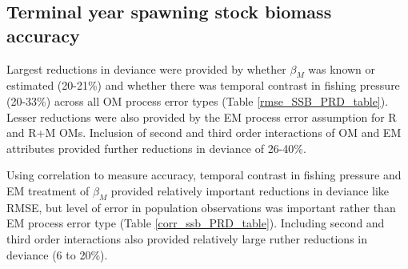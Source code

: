 \documentclass[
  12pt,
]{article}
\begin{document}
\subsection*{Terminal year spawning stock biomass
accuracy}\label{terminal-year-spawning-stock-biomass-accuracy}

Largest reductions in deviance were provided by whether \(\beta_M\) was
known or estimated (20-21\%) and whether there was temporal contrast in
fishing pressure (20-33\%) across all OM process error types (Table
\ref{rmse_SSB_PRD_table}). Lesser reductions were also provided by the
EM process error assumption for R and R+M OMs. Inclusion of second and
third order interactions of OM and EM attributes provided further
reductions in deviance of 26-40\%.

Using correlation to measure accuracy, temporal contrast in fishing
pressure and EM treatment of \(\beta_M\) provided relatively important
reductions in deviance like RMSE, but level of error in population
observations was important rather than EM process error type (Table
\ref{corr_ssb_PRD_table}). Including second and third order interactions
also provided relatively large ruther reductions in deviance (6 to
20\%).

\begin{table}
\caption{Percent reduction in deviance for logistic regression models fit to indicators of convergence (providing Hessian-based standard errors). Table rows give each operating model (OM) and estimating model (EM) factor included individually, combined, and with second and third order interactions. Table columns categorize operating models (OMs) with process error on recruitment only (R), recruitment and apparent survival (R+S), or recruitment and natural mortality (R+M). See Table \ref{factor_table} for further details.}\label{convergence_PRD_table}
{}
\end{table}
\pagebreak

\begin{table}
\caption{Percent reduction in deviance for multinomial logistic regression models fit to indicators of process error assumption in the estimating models with lowest AIC. See Tables \ref{convergence_PRD_table} and \ref{factor_table} for further details.}\label{AIC_PE_PRD_table}
{}
\end{table}
\pagebreak

\begin{table}
\caption{Percent reduction in deviance for logistic regression models fit to indicators of correct estimating model (EM) covariate effect assumption (no effect for operating models assuming $\beta_E = 0$ or estimated effect for operating models assuming $\beta_E > 0$) with lowest AIC. Table columns categorize operating models with different true values for $\beta_E$. See Tables \ref{convergence_PRD_table} and \ref{factor_table} for further details.}\label{AIC_Ecov_effect_PRD_table}
{}
\end{table}
\pagebreak
\end{document}
